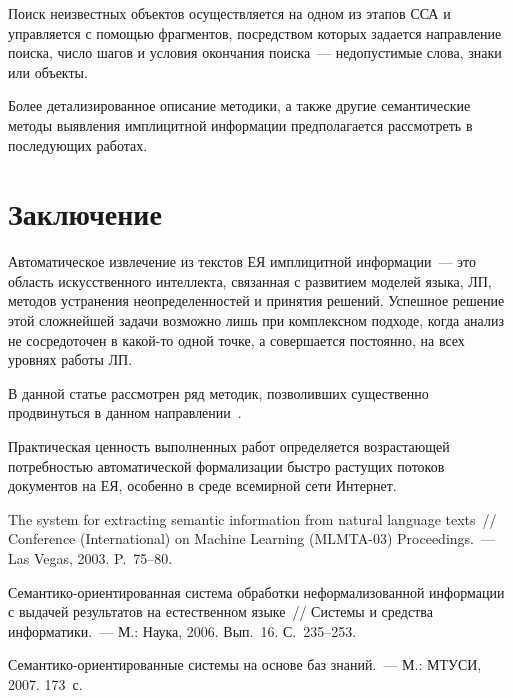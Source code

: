\begin{multicols}{2}
     Поиск неизвестных объектов осуществляется на одном из этапов
ССА и управ\-ля\-ет\-ся с помощью 
фрагментов, посредством которых задается на\-прав\-ле\-ние поиска, число шагов и 
условия окончания поиска~--- недопустимые слова, знаки или объекты.
     
     Более детализированное описание методики, а также другие 
семантические методы выявления имплицитной информации предполагается 
рас\-смот\-реть в последующих работах. 

\vspace*{-9pt}

\section{Заключение}
     
     Автоматическое извлечение из текстов ЕЯ 
имплицитной информации~--- это область искусственного интеллекта, 
связанная с развитием моделей языка, ЛП, 
методов устранения неопределенностей и принятия решений. Успешное 
решение этой сложнейшей задачи возможно лишь при комплексном подходе, 
когда анализ не сосредоточен в какой-то одной точке, а совершается постоянно, 
на всех уровнях работы ЛП. 
     
     В данной статье рассмотрен ряд методик, позволивших существенно 
продвинуться в данном направлении~\cite{18kuz}. 

Практическая ценность выполненных работ определяется возрастающей 
потребностью автоматической формализации быстро растущих потоков 
документов на ЕЯ, особенно в среде всемирной сети Интернет.

\vspace*{-9pt}

{\small\frenchspacing
{%
\begin{thebibliography}{99}

 The system for extracting semantic information 
from natural language texts~// Conference (International) on Machine Learning 
(MLMTA-03) Proceedings.~--- Las Vegas, 2003. P.~75--80. 

Семантико-ори\-ен\-ти\-ро\-ван\-ная сис\-те\-ма обработки неформализованной 
информации с выдачей результатов на естественном языке~// Сис\-те\-мы и 
средства информатики.~--- М.: Наука, 2006. Вып.~16. С.~235--253.

Се\-ман\-ти\-ко-ори\-ен\-ти\-ро\-ван\-ные системы на основе баз знаний.~--- М.: 
\mbox{МТУСИ}, 2007. 173~с.


\end{thebibliography}}}
\end{multicols}
